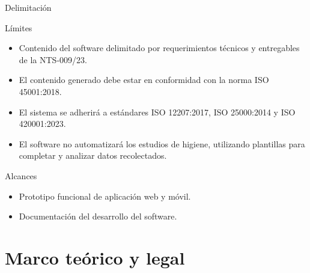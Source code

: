 \documentclass[spanish, aspectratio=169]{beamer}
\begin{document}
\begin{frame}{Delimitación}
  \begin{block}{Límites}
  \begin{itemize}
  \item Contenido del software delimitado por requerimientos técnicos y entregables de la NTS-009/23.
  \item El contenido generado debe estar en conformidad con la norma ISO 45001:2018.
  \item El sistema se adherirá a estándares ISO 12207:2017, ISO 25000:2014 y ISO 420001:2023.
  \item El software no automatizará los estudios de higiene, utilizando plantillas para completar y analizar datos recolectados.
  \end{itemize}
  \end{block}
  \begin{block}{Alcances}
  \begin{itemize}
  \item Prototipo funcional de aplicación web y móvil.
  \item Documentación del desarrollo del software.
  \end{itemize}
  \end{block}
\end{frame}

\section{Marco teórico y legal}
\end{document}
